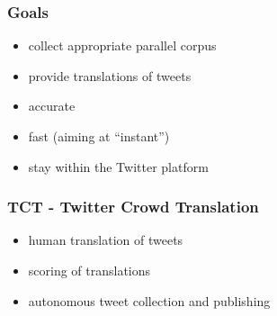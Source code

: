 \documentclass[12pt]{beamer}
\begin{document}
\begin{frame}
	\frametitle{Goals}
	\begin{itemize}
		\item \textcolor{TCTsilver}{\Large collect appropriate parallel corpus}
		\item \textcolor{TCTsilver}{provide translations of tweets}
		\item \textcolor{TCTsilver}{accurate}
		\item \textcolor{TCTsilver}{fast (aiming at ``instant'')}
		\item \textcolor{TCTsilver}{stay within the Twitter platform}
	\end{itemize}
\end{frame}

\begin{frame}
	\frametitle{TCT - Twitter Crowd Translation}
	\begin{itemize}
		\item \textcolor{TCTsilver}{human translation of tweets}
		\item \textcolor{TCTsilver}{scoring of translations}
		\item \textcolor{TCTsilver}{autonomous tweet collection and publishing}
	\end{itemize}
\end{frame}

\end{document}
